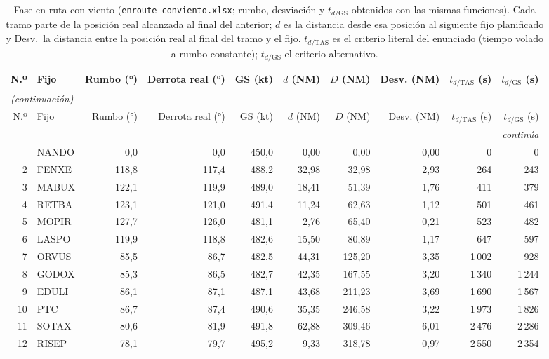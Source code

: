 \begingroup\scriptsize\setlength{\tabcolsep}{2.8pt}
\begin{longtable}{rlrrrrrrrr}
\caption{Fase en-ruta con viento (\texttt{enroute-conviento.xlsx}; rumbo, desviación y $t_{d/\mathrm{GS}}$ obtenidos con las mismas funciones). Cada tramo parte de la posición real alcanzada al final del anterior; $d$ es la distancia desde esa posición al siguiente fijo planificado y Desv.\ la distancia entre la posición real al final del tramo y el fijo. $t_{d/\mathrm{TAS}}$ es el criterio literal del enunciado (tiempo volado a rumbo constante); $t_{d/\mathrm{GS}}$ el criterio alternativo.}\label{tab:enr1}\\
\toprule
N.º & Fijo & Rumbo (°) & Derrota real (°) & GS (kt) & $d$ (NM) & $D$ (NM) & Desv. (NM) & $t_{d/\mathrm{TAS}}$ (s) & $t_{d/\mathrm{GS}}$ (s)\\
\midrule
\endfirsthead
\multicolumn{10}{l}{\small\itshape (continuación)}\\
\toprule
N.º & Fijo & Rumbo (°) & Derrota real (°) & GS (kt) & $d$ (NM) & $D$ (NM) & Desv. (NM) & $t_{d/\mathrm{TAS}}$ (s) & $t_{d/\mathrm{GS}}$ (s)\\
\midrule
\endhead
\midrule
\multicolumn{10}{r}{\small\itshape continúa}\\
\endfoot
\bottomrule
\endlastfoot
1 & NANDO & 0,0 & 0,0 & 450,0 & 0,00 & 0,00 & 0,00 & 0 & 0\\
2 & FENXE & 118,8 & 117,4 & 488,2 & 32,98 & 32,98 & 2,93 & 264 & 243\\
3 & MABUX & 122,1 & 119,9 & 489,0 & 18,41 & 51,39 & 1,76 & 411 & 379\\
4 & RETBA & 123,1 & 121,0 & 491,4 & 11,24 & 62,63 & 1,12 & 501 & 461\\
5 & MOPIR & 127,7 & 126,0 & 481,1 & 2,76 & 65,40 & 0,21 & 523 & 482\\
6 & LASPO & 119,9 & 118,8 & 482,6 & 15,50 & 80,89 & 1,17 & 647 & 597\\
7 & ORVUS & 85,5 & 86,7 & 482,5 & 44,31 & 125,20 & 3,35 & 1\,002 & 928\\
8 & GODOX & 85,3 & 86,5 & 482,7 & 42,35 & 167,55 & 3,20 & 1\,340 & 1\,244\\
9 & EDULI & 86,1 & 87,1 & 487,1 & 43,68 & 211,23 & 3,69 & 1\,690 & 1\,567\\
10 & PTC & 86,7 & 87,4 & 490,6 & 35,35 & 246,58 & 3,22 & 1\,973 & 1\,826\\
11 & SOTAX & 80,6 & 81,9 & 491,8 & 62,88 & 309,46 & 6,01 & 2\,476 & 2\,286\\
12 & RISEP & 78,1 & 79,7 & 495,2 & 9,33 & 318,78 & 0,97 & 2\,550 & 2\,354\\

\end{longtable}
